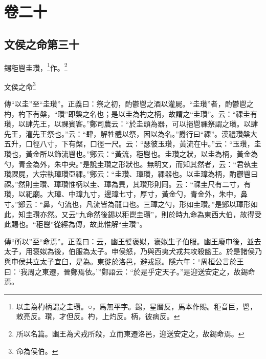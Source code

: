 

\chapter{卷二十}


\section{文侯之命第三十}


錫秬鬯圭瓚，\footnote{以圭為杓柄謂之圭瓚。○，馬無平字。錫，星曆反，馬本作賜。秬音巨，鬯，敕亮反。瓚，才但反。杓，上灼反。柄，彼病反。}作。\footnote{所以名篇。幽王為犬戎所殺，立而東遷洛邑，迎送安定之，故錫命焉。}

文侯之命\footnote{命為侯伯。}

{\noindent\zhuan{}\fzbyks 傳“以圭”至“圭瓚”。正義曰：祭之初，酌鬱鬯之酒以灌屍。“圭瓚”者，酌鬱鬯之杓，杓下有槃，“瓚”即槃之名也；是以圭為杓之柄，故謂之“圭瓚”。云：“祼圭有瓚，以肆先王，以祼賓客。”鄭司農云：“於圭頭為器，可以挹鬯祼祭謂之瓚。以肆先王，灌先王祭也。”云：“肆，解牲體以祭，因以為名。”爵行曰“祼”。漢禮瓚槃大五升，口徑八寸，下有槃，口徑一尺。云：“瑟彼玉瓚，黃流在中。”云：“玉瓚，圭瓚也，黃金所以飾流鬯也。”鄭云：“黃流，秬鬯也。圭瓚之狀，以圭為柄，黃金為勺，青金為外，朱中央。”是說圭瓚之形狀也。無明文，而知其然者，云：“君執圭瓚祼屍，大宗執璋瓚亞祼。”鄭云：“圭瓚、璋瓚，祼器也。以圭璋為柄，酌鬱鬯曰祼。”然則圭瓚、璋瓚惟柄以圭、璋為異，其瓚形則同。云：“祼圭尺有二寸，有瓚，以祀廟。大璋、中璋九寸，邊璋七寸，厚寸，黃金勺，青金外，朱中，鼻寸。”鄭云：“鼻，勺流也，凡流皆為龍口也。三璋之勺，形如圭瓚。”是鄭以璋形如此，知圭瓚亦然。又云“九命然後錫以秬鬯圭瓚”，則於時九命為東西大伯，故得受此賜也。“秬鬯”從經為傳，故此惟解“圭瓚”。 \par}

{\noindent\zhuan{}\fzbyks 傳“所以”至“命焉”。正義曰：云，幽王嬖褒姒，褒姒生子伯服。幽王廢申後，並去太子，用褒姒為後，伯服為太子。申侯怒，乃與西夷犬戎共攻殺幽王。於是諸侯乃與申侯共立太子宜臼，是為。東徙於洛邑，避戎寇。隱六年：“周桓公言於王曰：‘我周之東遷，晉鄭焉依。’”鄭語云：“於是乎定天子。”是迎送安定之，故錫命焉。 \par}

